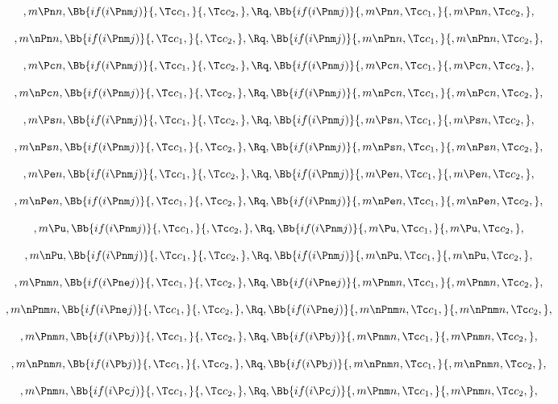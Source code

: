 \[,m \Pn n, \Bb{if(i \Pnm j)}{,\Tc c_1,}{,\Tc c_2,}, \Rq , \Bb{if(i \Pnm j)}{,m \Pn n,\Tc c_1,}{,m \Pn n,\Tc c_2,},\]
\bigskip
\bigskip

\[,m \nPn n, \Bb{if(i \Pnm j)}{,\Tc c_1,}{,\Tc c_2,}, \Rq , \Bb{if(i \Pnm j)}{,m \nPn n,\Tc c_1,}{,m \nPn n,\Tc c_2,},\]
\bigskip
\bigskip

\[,m \Pc n, \Bb{if(i \Pnm j)}{,\Tc c_1,}{,\Tc c_2,}, \Rq , \Bb{if(i \Pnm j)}{,m \Pc n,\Tc c_1,}{,m \Pc n,\Tc c_2,},\]
\bigskip
\bigskip

\[,m \nPc n, \Bb{if(i \Pnm j)}{,\Tc c_1,}{,\Tc c_2,}, \Rq , \Bb{if(i \Pnm j)}{,m \nPc n,\Tc c_1,}{,m \nPc n,\Tc c_2,},\]
\bigskip
\bigskip

\[,m \Ps n, \Bb{if(i \Pnm j)}{,\Tc c_1,}{,\Tc c_2,}, \Rq , \Bb{if(i \Pnm j)}{,m \Ps n,\Tc c_1,}{,m \Ps n,\Tc c_2,},\]
\bigskip
\bigskip

\[,m \nPs n, \Bb{if(i \Pnm j)}{,\Tc c_1,}{,\Tc c_2,}, \Rq , \Bb{if(i \Pnm j)}{,m \nPs n,\Tc c_1,}{,m \nPs n,\Tc c_2,},\]
\bigskip
\bigskip

\[,m \Pe n, \Bb{if(i \Pnm j)}{,\Tc c_1,}{,\Tc c_2,}, \Rq , \Bb{if(i \Pnm j)}{,m \Pe n,\Tc c_1,}{,m \Pe n,\Tc c_2,},\]
\bigskip
\bigskip

\[,m \nPe n, \Bb{if(i \Pnm j)}{,\Tc c_1,}{,\Tc c_2,}, \Rq , \Bb{if(i \Pnm j)}{,m \nPe n,\Tc c_1,}{,m \nPe n,\Tc c_2,},\]
\bigskip
\bigskip

\[,m \Pu, \Bb{if(i \Pnm j)}{,\Tc c_1,}{,\Tc c_2,}, \Rq , \Bb{if(i \Pnm j)}{,m \Pu,\Tc c_1,}{,m \Pu,\Tc c_2,},\]
\bigskip
\bigskip

\[,m \nPu, \Bb{if(i \Pnm j)}{,\Tc c_1,}{,\Tc c_2,}, \Rq , \Bb{if(i \Pnm j)}{,m \nPu,\Tc c_1,}{,m \nPu,\Tc c_2,},\]
\bigskip
\bigskip


\[,m \Pnm n, \Bb{if(i \Pne j)}{,\Tc c_1,}{,\Tc c_2,}, \Rq , \Bb{if(i \Pne j)}{,m \Pnm n,\Tc c_1,}{,m \Pnm n,\Tc c_2,},\]
\bigskip
\bigskip

\[,m \nPnm n, \Bb{if(i \Pne j)}{,\Tc c_1,}{,\Tc c_2,}, \Rq , \Bb{if(i \Pne j)}{,m \nPnm n,\Tc c_1,}{,m \nPnm n,\Tc c_2,},\]
\bigskip
\bigskip

\[,m \Pnm n, \Bb{if(i \Pb j)}{,\Tc c_1,}{,\Tc c_2,}, \Rq , \Bb{if(i \Pb j)}{,m \Pnm n,\Tc c_1,}{,m \Pnm n,\Tc c_2,},\]
\bigskip
\bigskip

\[,m \nPnm n, \Bb{if(i \Pb j)}{,\Tc c_1,}{,\Tc c_2,}, \Rq , \Bb{if(i \Pb j)}{,m \nPnm n,\Tc c_1,}{,m \nPnm n,\Tc c_2,},\]
\bigskip
\bigskip

\[,m \Pnm n, \Bb{if(i \Pc j)}{,\Tc c_1,}{,\Tc c_2,}, \Rq , \Bb{if(i \Pc j)}{,m \Pnm n,\Tc c_1,}{,m \Pnm n,\Tc c_2,},\]
\bigskip
\bigskip

